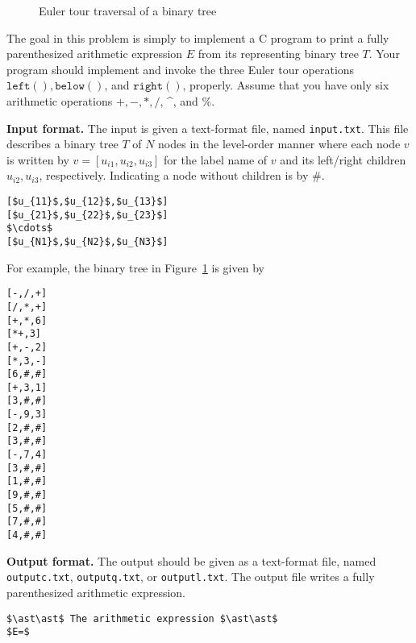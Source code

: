 \documentclass{article}
\begin{document}
\begin{figure}[h]
\caption{Euler tour traversal of a binary tree}\label{fig:euler}
\end{figure}  

\bigskip
The goal in this problem is simply to implement a C program to print a fully parenthesized arithmetic expression $E$ from its 
representing binary tree $T$. Your program should implement and invoke the three Euler tour operations $\mathtt{left}(),\mathtt{below}()$, and $\mathtt{right}()$, properly.
Assume that you have only six arithmetic operations $+,-,{\ast},/$, {\textasciicircum}, and $\%$.

\bigskip
\noindent\textbf{Input format.} %
The input is given a text-format file, named \texttt{input.txt}. This file describes a binary tree $T$ of $N$ nodes in the level-order manner where each node $v$ is 
written by $v=[u_{i1},u_{i2},u_{i3}]$ for the label name of $v$ and its left/right children $u_{i2},u_{i3}$, respectively.
Indicating a node without children is by \#.
\begin{lstlisting}[backgroundcolor=\color{yellow!40}]
[$u_{11}$,$u_{12}$,$u_{13}$]
[$u_{21}$,$u_{22}$,$u_{23}$]
$\cdots$
[$u_{N1}$,$u_{N2}$,$u_{N3}$]
\end{lstlisting}
For example,  the binary tree in Figure~\ref{fig:euler} is given by
\begin{lstlisting}[backgroundcolor=\color{white}]
[-,/,+]
[/,*,+]
[+,*,6]
[*+,3]
[+,-,2]
[*,3,-]
[6,#,#]
[+,3,1]
[3,#,#]
[-,9,3]
[2,#,#]
[3,#,#]
[-,7,4]
[3,#,#]
[1,#,#]
[9,#,#]
[5,#,#]
[7,#,#]
[4,#,#]
\end{lstlisting}


\bigskip
\noindent\textbf{Output format.} %
The output should be given as a text-format file, named \texttt{outputc.txt}, \texttt{outputq.txt}, or \texttt{outputl.txt}.
The output file writes a fully parenthesized arithmetic expression.

\begin{lstlisting}[backgroundcolor=\color{yellow!40}]
$\ast\ast$ The arithmetic expression $\ast\ast$
$E=$
\end{lstlisting}
\end{document}
